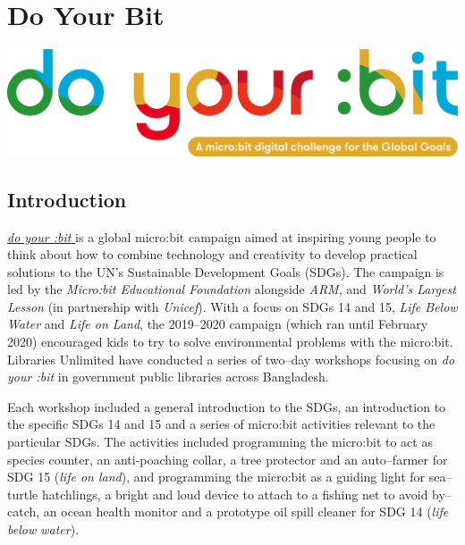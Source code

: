 \documentclass[12pt]{report} %
\newcommand{\DYB}{\textit{do your :bit }}
\begin{document}

\chapter{Do Your Bit}\label{chapter:DYB}
\graphicspath{{doyourbit/}{images/}} %

\includegraphics[width=0.7\linewidth, left]{DYBlogo} %

\section{Introduction} %

\href{https://microbit.org/do-your-bit/}{\DYB} is a global micro:bit campaign aimed at inspiring young people to think about how to combine technology and creativity to develop practical solutions to the UN's Sustainable Development Goals (SDGs). The campaign is led by the \textit{Micro:bit Educational Foundation} alongside \textit{ARM}, and \textit{World's Largest Lesson} (in partnership with \textit{Unicef}). With a focus on SDGs 14 and 15, \textit{Life Below Water} and \textit{Life on Land}, the 2019--2020 campaign (which ran until February 2020) encouraged kids to try to solve environmental problems with the micro:bit. Libraries Unlimited have conducted a series of two--day workshops focusing on \DYB in government public libraries across Bangladesh. 

Each workshop included a general introduction to the SDGs, an introduction to the specific SDGs 14 and 15 and a series of micro:bit activities relevant to the particular SDGs. The activities included programming the micro:bit to act as species counter, an anti-poaching collar, a tree protector and an auto--farmer for SDG 15 (\textit{life on land}), and programming the micro:bit as a guiding light for sea--turtle hatchlings, a bright and loud device to attach to a fishing net to avoid by--catch, an ocean health monitor and a prototype oil spill cleaner for SDG 14 (\textit{life below water}). 
\end{document}
